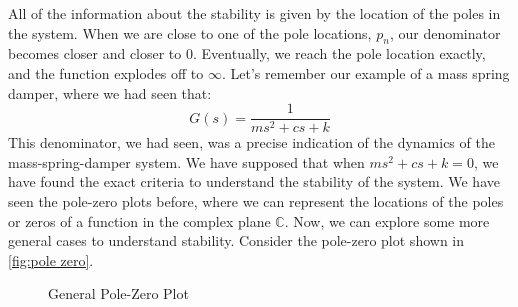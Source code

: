 All of the information about the stability is given by the location of the poles in the system. When we are close to one of the pole locations, $p_n$, our denominator becomes closer and closer to $0$. Eventually, we reach the pole location exactly, and the function explodes off to $\infty$. Let's remember our example of a mass spring damper, where we had seen that:
$$G(s)=\frac{1}{ms^2+cs+k}$$
This denominator, we had seen, was a precise indication of the dynamics of the mass-spring-damper system. We have supposed that when $ms^2+cs+k=0$, we have found the exact criteria to understand the stability of the system. We have seen the pole-zero plots before, where we can represent the locations of the poles or zeros of a function in the complex plane $\mathbb{C}$. Now, we can explore some more general cases to understand stability. Consider the pole-zero plot shown in \autoref{fig:pole zero}.
\begin{figure}[ht]
    \centering



    
    \caption{General Pole-Zero Plot}
    \label{fig:pole zero}
\end{figure}

